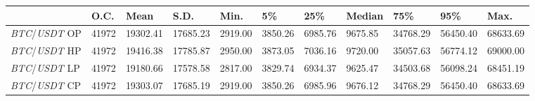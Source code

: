 \begin{tabular}{lllllllllll}
\toprule
 & \textbf{O.C.} & \textbf{Mean} & \textbf{S.D.} & \textbf{Min.} & \textbf{5\%} & \textbf{25\%} & \textbf{Median} & \textbf{75\%} & \textbf{95\%} & \textbf{Max.} \\
\midrule
\emph{BTC}/\emph{USDT} OP & 41972 & 19302.41 & 17685.23 & 2919.00 & 3850.26 & 6985.76 & 9675.85 & 34768.29 & 56450.40 & 68633.69 \\
\emph{BTC}/\emph{USDT} HP & 41972 & 19416.38 & 17785.87 & 2950.00 & 3873.05 & 7036.16 & 9720.00 & 35057.63 & 56774.12 & 69000.00 \\
\emph{BTC}/\emph{USDT} LP & 41972 & 19180.66 & 17578.58 & 2817.00 & 3829.74 & 6934.37 & 9625.47 & 34503.68 & 56098.24 & 68451.19 \\
\emph{BTC}/\emph{USDT} CP & 41972 & 19303.07 & 17685.19 & 2919.00 & 3850.26 & 6985.96 & 9676.12 & 34768.29 & 56450.40 & 68633.69 \\
\bottomrule
\end{tabular}
